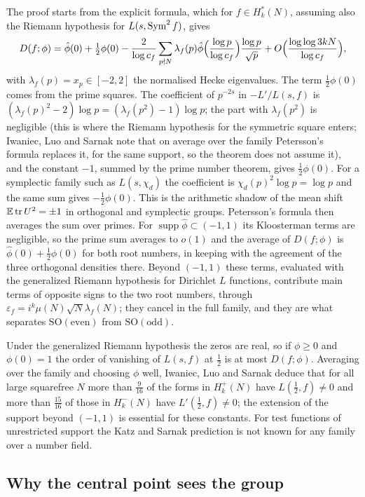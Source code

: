 The proof starts from the explicit formula, which for $f\in H_k^*(N)$, assuming also the Riemann hypothesis for $L(s,\operatorname{Sym}^2f)$, gives
\[
D(f;\phi)=\hat\phi(0)+\tfrac12\phi(0)-\frac{2}{\log c_f}\sum_{p\nmid N}\lambda_f(p)\hat\phi\Bigl(\frac{\log p}{\log c_f}\Bigr)\frac{\log p}{\sqrt p}+O\Bigl(\frac{\log\log3kN}{\log c_f}\Bigr),
\]
with $\lambda_f(p)=x_p\in[-2,2]$ the normalised Hecke eigenvalues. The term $\frac12\phi(0)$ comes from the prime squares. The coefficient of $p^{-2s}$ in $-L'/L(s,f)$ is $(\lambda_f(p)^2-2)\log p=(\lambda_f(p^2)-1)\log p$; the part with $\lambda_f(p^2)$ is negligible (this is where the Riemann hypothesis for the symmetric square enters; Iwaniec, Luo and Sarnak note that on average over the family Petersson's formula replaces it, for the same support, so the theorem does not assume it), and the constant $-1$, summed by the prime number theorem, gives $\frac12\phi(0)$. For a symplectic family such as $L(s,\chi_d)$ the coefficient is $\chi_d(p)^2\log p=\log p$ and the same sum gives $-\frac12\phi(0)$. This is the arithmetic shadow of the mean shift $\mathbb{E}\operatorname{tr} U^2=\pm1$ in orthogonal and symplectic groups. Petersson's formula then averages the sum over primes. For $\operatorname{supp}\hat\phi\subset(-1,1)$ its Kloosterman terms are negligible, so the prime sum averages to $o(1)$ and the average of $D(f;\phi)$ is $\hat\phi(0)+\frac12\phi(0)$ for both root numbers, in keeping with the agreement of the three orthogonal densities there. Beyond $(-1,1)$ these terms, evaluated with the generalized Riemann hypothesis for Dirichlet $L$ functions, contribute main terms of opposite signs to the two root numbers, through $\varepsilon_f=i^k\mu(N)\sqrt N\lambda_f(N)$; they cancel in the full family, and they are what separates $\mathrm{SO(even)}$ from $\mathrm{SO(odd)}$.

Under the generalized Riemann hypothesis the zeros are real, so if $\phi\ge0$ and $\phi(0)=1$ the order of vanishing of $L(s,f)$ at $\frac12$ is at most $D(f;\phi)$. Averaging over the family and choosing $\phi$ well, Iwaniec, Luo and Sarnak deduce that for all large squarefree $N$ more than $\frac9{16}$ of the forms in $H_k^+(N)$ have $L(\frac12,f)\ne0$ and more than $\frac{15}{16}$ of those in $H_k^-(N)$ have $L'(\frac12,f)\ne0$; the extension of the support beyond $(-1,1)$ is essential for these constants. For test functions of unrestricted support the Katz and Sarnak prediction is not known for any family over a number field.

\subsection{Why the central point sees the group}

